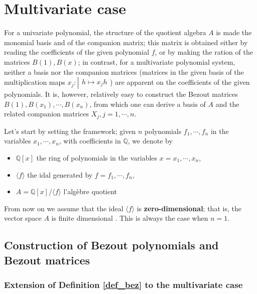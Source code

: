 \documentclass{standalone}
\begin{document}
\section{Multivariate case}
\label{multivariate}

For a univariate polynomial, the structure of the quotient algebra $A$ is made the monomial basis and of the companion matrix; this matrix is obtained either by reading the coefficients of the given polynomial $f$, or by making the ration of the matrices $B(1), B(x)$; in contrast, for a multivariate polynomial system, neither a basis nor the companion matrices (matrices in the given basis of the multiplication maps
$x_j : \left\vert
\begin{array}{c}
h \mapsto x_jh
\end{array}
\right.$) are apparent on the coefficients of the given polynomials. It is, however, relatively easy to construct the Bezout matrices $B(1), B(x_1), \cdots, B(x_n)$, from which one can derive a basis of $A$ and the related companion matrices $X_j, j=1, \cdots, n$. 

Let's start by setting the framework; given $n$ polynomials $f_1,\cdots, f_n$ in the variables $x_1,\cdots, x_n$, with coefficients in $\mathbb{Q}$, we denote by
\begin{itemize}
\item $\mathbb{Q}[x]$ the ring of polynomials in the variables $x = x_1,\cdots, x_n$,
\item $\langle f \rangle$ the idal generated by $f = f_1,\cdots, f_n$,
\item $A = \mathbb{Q}[x]/\langle f\rangle$ l'algèbre quotient
\end{itemize}
From now on we assume that the ideal $\langle f\rangle$ is {\bf zero-dimensional}; that is, the vector space $A$ is finite dimensional \cite[p.~234]{clo}. This is always the case when $n = 1$.

\subsection{Construction of Bezout polynomials and Bezout matrices}

\subsubsection{Extension of Definition \ref{def_bez} to the multivariate case}
\end{document}
